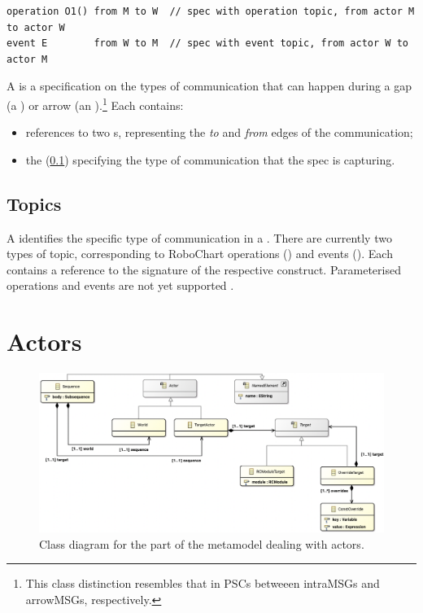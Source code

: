 \begin{lstlisting}[style=Example]
operation O1() from M to W  // spec with operation topic, from actor M to actor W
event E        from W to M  // spec with event topic, from actor W to actor M
\end{lstlisting}

A \mmessagespec{} is a specification on the types of communication that can
happen during a gap (a \mgapmessagespec) or arrow (an \marrowmessagespec).\footnote{
This class distinction resembles that in PSCs betweeen intraMSGs and arrowMSGs,
respectively.}  Each \mmessagespec{} contains:

\begin{itemize}
\item
	references to two \mactor s, representing the \emph{to} and \emph{from}
	edges of the communication;
\item
	the \mmessagetopic{} (\cref{ssec:metamodel-messages-topics}) specifying
	the type of communication that the spec is capturing.
\end{itemize}

\subsection{Topics}\label{ssec:metamodel-messages-topics}

A \mmessagetopic{} identifies the specific type of communication in a
\mmessagespec{}.  There are currently two types of topic, corresponding to
RoboChart operations (\moperationmessagetopic) and events (\meventmessagetopic).
Each contains a reference to the signature of the respective construct.
Parameterised operations and events are not yet supported .


\section{Actors}\label{sec:metamodel-actors}

\begin{figure}
	\centering
	\includegraphics[width=\textwidth]{diagrams/actors.png}
	\caption{Class diagram for the part of the \langname{} metamodel dealing with actors.}
	\label{fig:metamodel-actors}
\end{figure}

